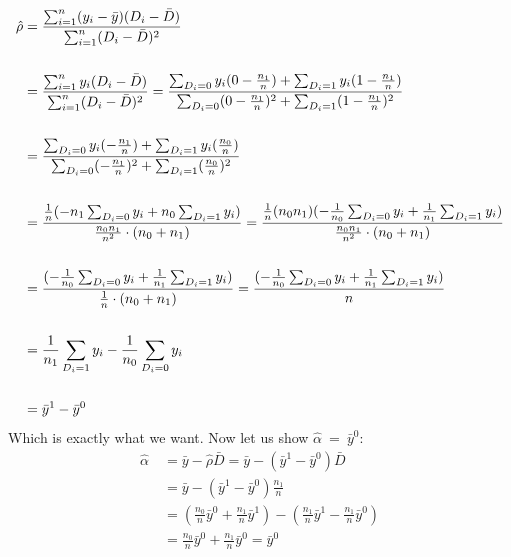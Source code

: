 \documentclass{article}
\newcommand{\gap}{\vspace{1 em}}
\begin{document}
\begin{enumerate}[label=\textbf{Q\arabic{enumi}}.,ref=Q\arabic{enumi}, wide=0pt, itemsep=1em, topsep=5pt]
\begin{enumerate}
\begin{solution}
{                \begin{align*}
                \hat{\rho}  \gap & = \frac{\sum_{i=1}^n (y_i - \bar{y})(D_i - \bar{D})}{\sum_{i = 1}^n (D_i - \bar{D})^2} \\
                \\
                                 & = \frac{\sum_{i=1}^n y_i (D_i - \bar{D})}{\sum_{i=1}^n (D_i - \bar{D})^2} = \frac{\sum_{D_i = 0} y_i (0 - \frac{n_1}{n}) + \sum_{D_i = 1} y_i (1 - \frac{n_1}{n})}{\sum_{D_i = 0} (0 - \frac{n_1}{n})^2 + \sum_{D_i = 1} (1 - \frac{n_1}{n})^2} \\ \\
                                 & = \frac{\sum_{D_i = 0} y_i (-\frac{n_1}{n}) + \sum_{D_i = 1} y_i (\frac{n_0}{n})}{\sum_{D_i = 0} (-\frac{n_1}{n})^2 + \sum_{D_i = 1} (\frac{n_0}{n})^2} \\ \\
                                 & = \frac{\frac{1}{n} (-n_1 \sum_{D_i = 0} y_i + n_0 \sum_{D_i = 1} y_i)}{\frac{n_0 n_1}{n^2} \cdot (n_0 + n_1)} = \frac{\frac{1}{n} (n_0 n_1)(-\frac{1}{n_0} \sum_{D_i = 0} y_i + \frac{1}{n_1} \sum_{D_i = 1} y_i)}{\frac{n_0 n_1}{n^2} \cdot (n_0 + n_1)}\\ \\ 
                                 & = \frac{(-\frac{1}{n_0}\sum_{D_i = 0} y_i + \frac{1}{n_1}\sum_{D_i = 1} y_i)}{\frac{1}{n} \cdot (n_0 + n_1)} = \frac{(-\frac{1}{n_0}\sum_{D_i = 0} y_i + \frac{1}{n_1}\sum_{D_i = 1} y_i)}{n}  \\ \\ 
                                 & = \frac{1}{n_1}\sum_{D_i = 1}{y_i} - \frac{1}{n_0} \sum_{D_i = 0} y_i\\ \\
                                 & = \bar{y}^1 - \bar{y}^0
                \end{align*}
                Which is exactly what we want. Now let us show $\hat{\alpha} \ = \ \bar{y}^0$:
                \begin{align*}
                \hat{\alpha} \  &= \bar{y} - \hat{\rho} \bar{D} = \bar{y} - (\bar{y}^1 - \bar{y}^0)\bar{D} \\ 
                &= \bar{y} - (\bar{y}^1 - \bar{y}^0) \frac{n_1}{n} \\
                & = \left( \frac{n_0}{n}\bar{y}^0 + \frac{n_1}{n}\bar{y}^1 \right) - (\frac{n_1}{n} \bar{y}^1 - \frac{n_1}{n}\bar{y}^0) \\ 
                & = \frac{n_0}{n}\bar{y}^0 + \frac{n_1}{n}\bar{y}^0 = \bar{y}^0
                \end{align*}

}
\end{solution}
\end{enumerate}
\end{enumerate}
\end{document}
